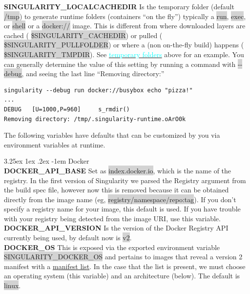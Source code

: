 \documentclass[a4paper]{article}
\makeatletter
\newcounter{subsubsubsection}[subsubsection]
\renewcommand\paragraph{\@startsection{paragraph}{5}{\z@}%
  {3.25ex \@plus1ex \@minus.2ex}%
  {-1em}%
  {\normalfont\normalsize\bfseries}}
\newcommand{\tab}[1]{\hspace{.2\textwidth}\rlap{#1}}
\makeatother
\begin{document}
\textbf{SINGULARITY\_LOCALCACHEDIR} Is the temporary folder (default  \colorbox{lightgray}{/tmp}) to generate runtime folders (containers “on the fly”) typically a  \colorbox{lightgray}{run},  \colorbox{lightgray}{exec}, or  \colorbox{lightgray}{shell} or a  \colorbox{lightgray}{docker://} image. This is different from where downloaded layers are cached ( \colorbox{lightgray}{\$SINGULARITY\_CACHEDIR}) or pulled ( \colorbox{lightgray}{\$SINGULARITY\_PULLFOLDER}) or where a (non on-the-fly build) happens ( \colorbox{lightgray}{\$SINGULARITY\_TMPDIR}). See \hyperref[sec:temporaryfolders]{{\textcolor{cyan}{temporary folders}}} above for an example. You can generally determine the value of this setting by running a command with  \colorbox{lightgray}{-{}-debug}, and seeing the last line “Removing directory:”\\[0.1in]

\begin{lstlisting}[frame=single]
singularity --debug run docker://busybox echo "pizza!"
...
DEBUG   [U=1000,P=960]     s_rmdir()                                 Removing directory: /tmp/.singularity-runtime.oArO0k
\end{lstlisting}

	
	The following variables have defaults that can be customized by you via environment variables at runtime.

	\paragraph{Docker}\tab{}\\[0.2in]\textbf{DOCKER\_API\_BASE} Set as \colorbox{lightgray}{index.docker.io}, which is the name of the registry. In the first version of Singularity we parsed the Registry argument from the build spec file, however now this is removed because it can be obtained directly from the image name (eg, \colorbox{lightgray}{registry/namespace/repo:tag}). If you don’t specify a registry name for your image, this default is used. If you have trouble with your registry being detected from the image URI, use this variable.\\[0.1in]

\textbf{DOCKER\_API\_VERSION} Is the version of the Docker Registry API currently being used, by default now is \colorbox{lightgray}{v2}.\\[0.1in]

\textbf{DOCKER\_OS} This is exposed via the exported environment variable \colorbox{lightgray}{SINGULARITY\_DOCKER\_OS} and pertains to images that reveal a version 2 manifest with a \href{https://docs.docker.com/registry/spec/manifest-v2-2/#manifest-list}{manifest list}. In the case that the list is present, we must choose an operating system (this variable) and an architecture (below). The default is \colorbox{lightgray}{linux}.\\[0.1in]
\end{document}
